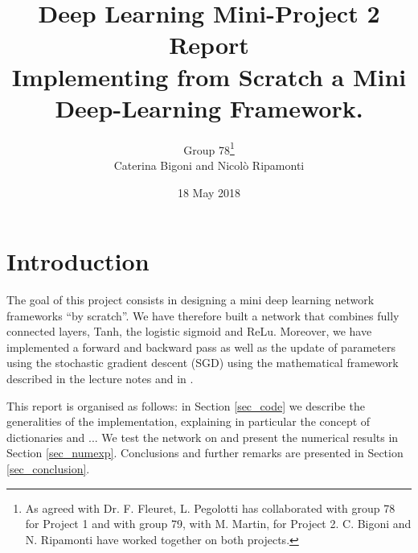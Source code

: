 \documentclass{article}
\begin{document}
\title{Deep Learning Mini-Project 2 Report \\ Implementing from Scratch a Mini Deep-Learning Framework.}
\author{Group 78\footnote{As agreed with Dr. F. Fleuret, L. Pegolotti has collaborated with group 78 for Project 1 and with group 79, with M. Martin, for Project 2. C. Bigoni and N. Ripamonti have worked together on both projects.}  \\ Caterina Bigoni and Nicol\`o Ripamonti}
\date{18 May 2018}
\maketitle





\section{Introduction}
The goal of this project consists in designing a mini deep learning network frameworks ``by scratch''. 
We have therefore built a network that combines fully connected layers, Tanh, the logistic sigmoid and ReLu. 
Moreover, we have implemented a forward and backward pass as well as the update of parameters using the stochastic gradient descent (SGD) using the mathematical framework described in the lecture notes \cite{lec_notes_fleuret} and in \cite{goodfellow2016deep}. 

This report is organised as follows: in Section \ref{sec_code} we describe the generalities of the implementation, explaining in particular the concept of dictionaries and ... 
We test the network on and  present the numerical results in Section \ref{sec_numexp}.
Conclusions and further remarks are presented in Section \ref{sec_conclusion}.
\end{document}
